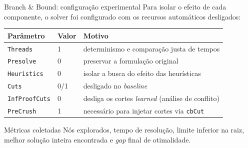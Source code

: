 \documentclass[10pt,aspectratio=169]{beamer}
\begin{document}
\begin{frame}{Branch \& Bound: configuração experimental}
  \small
  Para isolar o efeito de cada componente, o solver foi configurado com os
  recursos automáticos desligados:

  \vspace{0.6em}
  \centering
  \begin{tabular}{llp{5.6cm}}
    \toprule
    Parâmetro & Valor & Motivo \\
    \midrule
    \texttt{Threads}       & 1 & determinismo e comparação justa de tempos \\
    \texttt{Presolve}      & 0 & preservar a formulação original \\
    \texttt{Heuristics}    & 0 & isolar a busca do efeito das heurísticas \\
    \texttt{Cuts}          & 0/1 & desligado no \emph{baseline} \\
    \texttt{InfProofCuts}  & 0 & desliga os cortes \emph{learned} (análise de conflito) \\
    \texttt{PreCrush}      & 1 & necessário para injetar cortes via \texttt{cbCut} \\
    \bottomrule
  \end{tabular}

  \vspace{1em}
  \raggedright
  \begin{block}{Métricas coletadas}
    \footnotesize
    Nós explorados, tempo de resolução, limite inferior na raiz, melhor
    solução inteira encontrada e \emph{gap} final de otimalidade.
  \end{block}
\end{frame}
\end{document}

